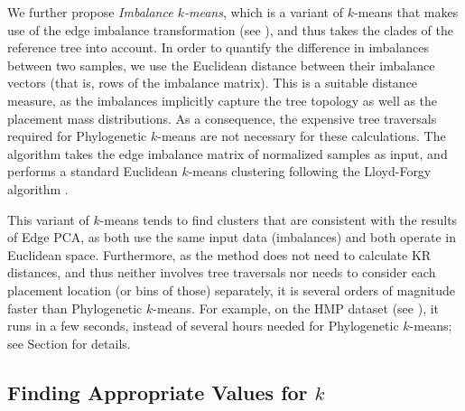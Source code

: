 We further propose \emph{Imbalance $k$-means},
which is a variant of $k$-means that makes use of the edge imbalance transformation
(see ),
and thus takes the clades of the reference tree into account.
In order to quantify the difference in imbalances between two samples,
we use the Euclidean distance between their imbalance vectors (that is, rows of the imbalance matrix).
This is a suitable distance measure,
as the imbalances implicitly capture the tree topology as well as the placement mass distributions.
As a consequence, the expensive tree traversals required for Phylogenetic $k$-means are not necessary for these calculations.
The algorithm takes the edge imbalance matrix of normalized samples as input,
and performs a standard Euclidean $k$-means clustering following the Lloyd-Forgy algorithm \cite{Lloyd1982,Forgy1965}.

This variant of $k$-means tends to find clusters that are consistent with the results of Edge PCA,
as both use the same input data (imbalances) and both operate in Euclidean space. %
Furthermore, as the method does not need to calculate KR distances,
and thus neither involves tree traversals nor needs to consider each placement location (or bins of those) separately,
it is several orders of magnitude faster than Phylogenetic $k$-means.
For example, on the \ac{HMP} dataset (see ),
it runs in a few seconds, instead of several hours needed for Phylogenetic $k$-means;
see Section  for details.


\subsection{Finding Appropriate Values for \texorpdfstring{$k$}{k}}
\label{ch:Clustering:sec:Methods:sub:FindingK}


